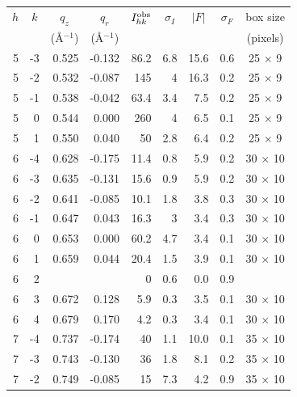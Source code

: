 \begin{table}[htbp]
  \centering
  \begin{tabular}{rrrrrrrrc}
    \hline
    \multicolumn{1}{c}{$h$} & \multicolumn{1}{c}{$k$} & \multicolumn{1}{c}{$q_z$} & 
    \multicolumn{1}{c}{$q_r$} & \multicolumn{1}{c}{$I_{hk}^\textrm{obs}$} & 
    \multicolumn{1}{c}{$\sigma_I$} & \multicolumn{1}{c}{$|F|$} &
    \multicolumn{1}{c}{$\sigma_F$} & \multicolumn{1}{c}{box size} \\
     & & \multicolumn{1}{c}{(\AA$^{-1}$)} & \multicolumn{1}{c}{(\AA$^{-1}$)} & & & & &
    \multicolumn{1}{c}{(pixels)} \\ 
    \hline
5     & -3    & 0.525 & -0.132 & 86.2  & 6.8   & 15.6  & 0.6   & 25 $\times$ 9 \\
5     & -2    & 0.532 & -0.087 & 145   & 4     & 16.3  & 0.2   & 25 $\times$ 9 \\
5     & -1    & 0.538 & -0.042 & 63.4  & 3.4   & 7.5   & 0.2   & 25 $\times$ 9 \\
5     & 0     & 0.544 & 0.000 & 260   & 4     & 6.5   & 0.1   & 25 $\times$ 9 \\
5     & 1     & 0.550 & 0.040 & 50    & 2.8   & 6.4   & 0.2   & 25 $\times$ 9 \\
6     & -4    & 0.628 & -0.175 & 11.4  & 0.8   & 5.9   & 0.2   & 30 $\times$ 10 \\
6     & -3    & 0.635 & -0.131 & 15.6  & 0.9   & 5.9   & 0.2   & 30 $\times$ 10 \\
6     & -2    & 0.641 & -0.085 & 10.1  & 1.8   & 3.8   & 0.3   & 30 $\times$ 10 \\
6     & -1    & 0.647 & 0.043 & 16.3  & 3     & 3.4   & 0.3   & 30 $\times$ 10 \\
6     & 0     & 0.653 & 0.000 & 60.2  & 4.7   & 3.4   & 0.1   & 30 $\times$ 10 \\
6     & 1     & 0.659 & 0.044 & 20.4  & 1.5   & 3.9   & 0.1   & 30 $\times$ 10 \\
6     & 2     &       &       & 0     & 0.6   & 0.0   & 0.9   &  \\
6     & 3     & 0.672 & 0.128 & 5.9   & 0.3   & 3.5   & 0.1   & 30 $\times$ 10 \\
6     & 4     & 0.679 & 0.170 & 4.2   & 0.3   & 3.4   & 0.1   & 30 $\times$ 10 \\
7     & -4    & 0.737 & -0.174 & 40    & 1.1   & 10.0  & 0.1   & 35 $\times$ 10 \\
7     & -3    & 0.743 & -0.130 & 36    & 1.8   & 8.1   & 0.2   & 35 $\times$ 10 \\
7     & -2    & 0.749 & -0.085 & 15    & 7.3   & 4.2   & 0.9   & 35 $\times$ 10 \\

\end{tabular}
\end{table}
